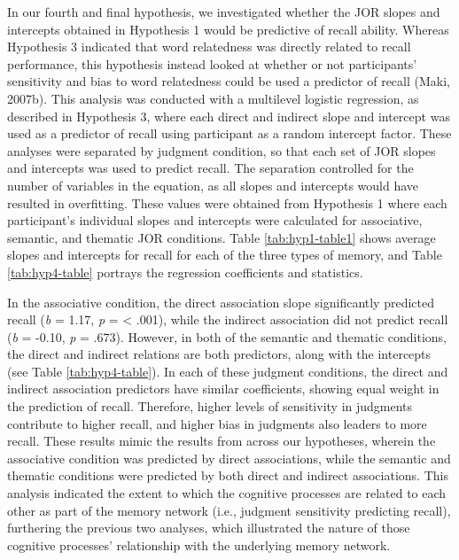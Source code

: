 \documentclass[english,,man]{apa6}
\begin{document}
In our fourth and final hypothesis, we investigated whether the JOR slopes and intercepts obtained in Hypothesis 1 would be predictive of recall ability. Whereas Hypothesis 3 indicated that word relatedness was directly related to recall performance, this hypothesis instead looked at whether or not participants' sensitivity and bias to word relatedness could be used a predictor of recall (Maki, 2007b). This analysis was conducted with a multilevel logistic regression, as described in Hypothesis 3, where each direct and indirect slope and intercept was used as a predictor of recall using participant as a random intercept factor. These analyses were separated by judgment condition, so that each set of JOR slopes and intercepts was used to predict recall. The separation controlled for the number of variables in the equation, as all slopes and intercepts would have resulted in overfitting. These values were obtained from Hypothesis 1 where each participant's individual slopes and intercepts were calculated for associative, semantic, and thematic JOR conditions. Table \ref{tab:hyp1-table1} shows average slopes and intercepts for recall for each of the three types of memory, and Table \ref{tab:hyp4-table} portrays the regression coefficients and statistics.

In the associative condition, the direct association slope significantly predicted recall (\emph{b} = 1.17, \emph{p} = \textless{} .001), while the indirect association did not predict recall (\emph{b} = -0.10, \emph{p} = .673). However, in both of the semantic and thematic conditions, the direct and indirect relations are both predictors, along with the intercepts (see Table \ref{tab:hyp4-table}). In each of these judgment conditions, the direct and indirect association predictors have similar coefficients, showing equal weight in the prediction of recall. Therefore, higher levels of sensitivity in judgments contribute to higher recall, and higher bias in judgments also leaders to more recall. These results mimic the results from across our hypotheses, wherein the associative condition was predicted by direct associations, while the semantic and thematic conditions were predicted by both direct and indirect associations. This analysis indicated the extent to which the cognitive processes are related to each other as part of the memory network (i.e., judgment sensitivity predicting recall), furthering the previous two analyses, which illustrated the nature of those cognitive processes' relationship with the underlying memory network.
\end{document}
